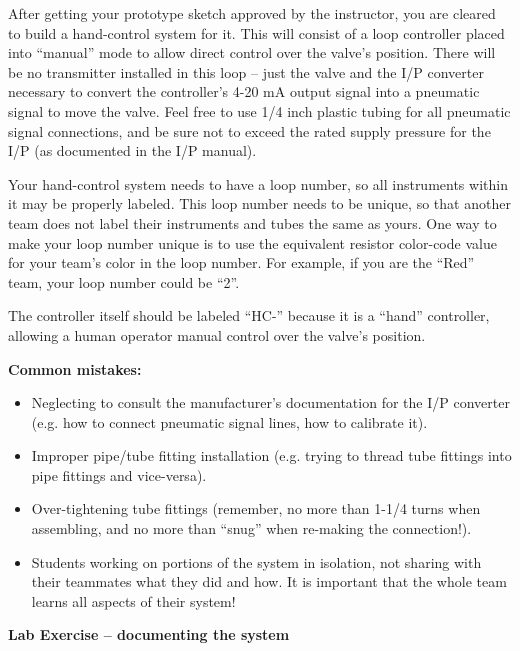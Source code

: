 After getting your prototype sketch approved by the instructor, you are cleared to build a hand-control system for it.  This will consist of a loop controller placed into ``manual'' mode to allow direct control over the valve's position.  There will be no transmitter installed in this loop -- just the valve and the I/P converter necessary to convert the controller's 4-20 mA output signal into a pneumatic signal to move the valve.  Feel free to use 1/4 inch plastic tubing for all pneumatic signal connections, and be sure not to exceed the rated supply pressure for the I/P (as documented in the I/P manual).

Your hand-control system needs to have a loop number, so all instruments within it may be properly labeled.  This loop number needs to be unique, so that another team does not label their instruments and tubes the same as yours.  One way to make your loop number unique is to use the equivalent resistor color-code value for your team's color in the loop number.  For example, if you are the ``Red'' team, your loop number could be ``2''. 

The controller itself should be labeled ``HC-'' because it is a ``hand'' controller, allowing a human operator manual control over the valve's position.

\vskip 10pt

{\bf Common mistakes:}

\begin{itemize}
\item{} Neglecting to consult the manufacturer's documentation for the I/P converter (e.g. how to connect pneumatic signal lines, how to calibrate it).
\item{} Improper pipe/tube fitting installation (e.g. trying to thread tube fittings into pipe fittings and vice-versa).
\item{} Over-tightening tube fittings (remember, no more than 1-1/4 turns when assembling, and no more than ``snug'' when re-making the connection!).
\item{} Students working on portions of the system in isolation, not sharing with their teammates what they did and how.  It is important that the whole team learns all aspects of their system!
\end{itemize}


\vfil \eject

\noindent
{\bf Lab Exercise -- documenting the system}

\vskip 5pt


